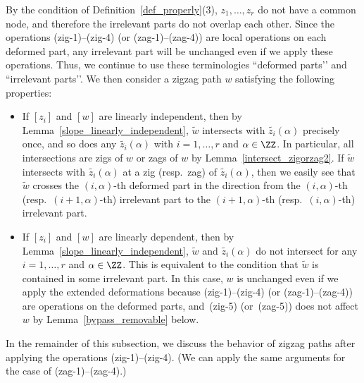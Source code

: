 \begin{observation}
By the condition of Definition~\ref{def_properly}(3), $z_1,\dots,z_r$ do not have a common node, and therefore the irrelevant parts do not overlap each other.
Since the operations (zig-1)--(zig-4) (or (zag-1)--(zag-4)) are local operations on each deformed part, any irrelevant part will be unchanged even if we apply these operations.
Thus, we continue to use these terminologies ``deformed parts’’ and ``irrelevant parts’’.
We then consider a zigzag path $w$ satisfying the following properties:
\begin{itemize}\itemsep=0pt
\item[(a)] If $[z_i]$ and $[w]$ are linearly independent, then by Lemma~\ref{slope_linearly_independent}, $\widetilde{w}$ intersects with $\widetilde{z_i}(\alpha)$ precisely once, and so does any $\widetilde{z_i}(\alpha)$ with $i=1,\dots,r$ and $\alpha\in\ZZ$.
In particular, all intersections are zigs of $w$ or zags of $w$ by Lemma~\ref{intersect_zigorzag2}.
If $\widetilde{w}$ intersects with $\widetilde{z_i}(\alpha)$ at a zig (resp.\ zag) of $\widetilde{z_i}(\alpha)$, then we easily see that $\widetilde{w}$ crosses the $(i,\alpha)$-th deformed part in the direction from the $(i,\alpha)$-th (resp.~$(i+1,\alpha)$-th) irrelevant part to the $(i+1,\alpha)$-th (resp.~$(i,\alpha)$-th) irrelevant part.

\item[(b)] If $[z_i]$ and $[w]$ are linearly dependent, then by Lemma~\ref{slope_linearly_independent}, $\widetilde{w}$ and $\widetilde{z_i}(\alpha)$ do not intersect for any $i=1,\dots,r$ and $\alpha\in\ZZ$.
This is equivalent to the condition that $\widetilde{w}$ is contained in some irrelevant part.
In this case, $w$ is unchanged even if we apply the extended deformations because (zig-1)--(zig-4) (or (zag-1)--(zag-4)) are operations on the deformed parts, and~(zig-5) (or~(zag-5)) does not affect $w$ by Lemma~\ref{bypass_removable} below.
\end{itemize}
\end{observation}

In the remainder of this subsection, we discuss the behavior of zigzag paths after applying the operations (zig-1)--(zig-4).
(We can apply the same arguments for the case of (zag-1)--(zag-4).)

